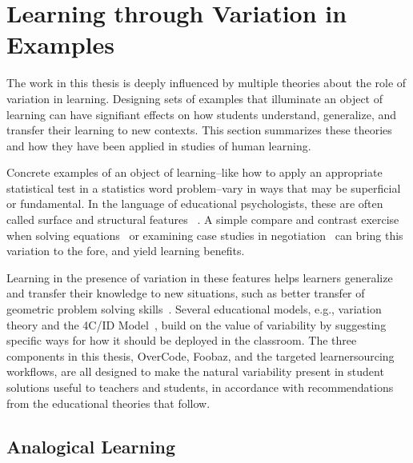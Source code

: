 \section{Learning through Variation in Examples}

The work in this thesis is deeply influenced by multiple theories about the role of variation in learning. Designing sets of examples that illuminate an object of learning can have signifiant effects on how students understand, generalize, and transfer their learning to new contexts. This section summarizes these theories and how they have been applied in studies of human learning.


Concrete examples of an object of learning--like how to apply an appropriate statistical test in a statistics word problem--vary in ways that may be superficial or fundamental. In the language of educational psychologists, these are often called surface and structural features ~\cite{quilicimayer}. A simple compare and contrast exercise when solving equations~\cite{rittle2007does} or examining case studies in negotiation~\cite{loewenstein2003analogical} can bring this variation to the fore, and yield learning benefits.

Learning in the presence of variation in these features helps learners generalize and transfer their knowledge to new situations, such as better transfer of geometric problem solving skills~\cite{workedexamplesvariability,Variabilityofpractice}. Several educational models, e.g., variation theory and the 4C/ID Model~\cite{van2002blueprints}, build on the value of variability by suggesting specific ways for how it should be deployed in the classroom. The three components in this thesis, OverCode, Foobaz, and the targeted learnersourcing workflows, are all designed to make the natural variability present in student solutions useful to teachers and students, in accordance with recommendations from the educational theories that follow.

\subsection{Analogical Learning}

